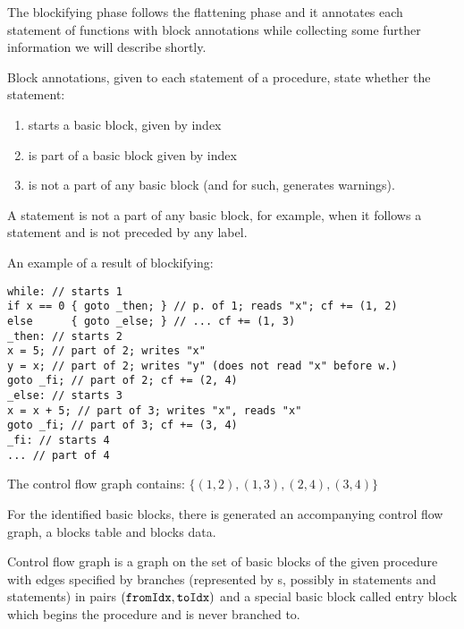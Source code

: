 The blockifying phase follows the flattening phase and it annotates each statement of functions with block annotations while collecting some further information we will describe shortly.

\begin{defn}
    Block annotations, given to each statement of a procedure, state whether the statement:

    \begin{enumerate}
        \item starts a basic block, given by index
        \item is part of a basic block given by index
        \item is not a part of any basic block (and for such, generates warnings).
    \end{enumerate}
\end{defn}

\begin{remark}
    A statement is not a part of any basic block, for example, when it follows a  statement and is not preceded by any label.
\end{remark}

\begin{ex}
    An example of a result of blockifying:
    \begin{lstlisting}
while: // starts 1
if x == 0 { goto _then; } // p. of 1; reads "x"; cf += (1, 2)
else      { goto _else; } // ... cf += (1, 3)
_then: // starts 2
x = 5; // part of 2; writes "x"
y = x; // part of 2; writes "y" (does not read "x" before w.)
goto _fi; // part of 2; cf += (2, 4)
_else: // starts 3
x = x + 5; // part of 3; writes "x", reads "x"
goto _fi; // part of 3; cf += (3, 4)
_fi: // starts 4
... // part of 4
    \end{lstlisting}

    The control flow graph contains: $\{(1,2), (1,3), (2,4), (3,4)\}$
\end{ex}

For the identified basic blocks, there is generated an accompanying control flow graph, a blocks table and blocks data.

\begin{defn}
    Control flow graph is a graph on the set of basic blocks of the given procedure with edges specified by branches (represented by s, possibly in  statements and  statements) in pairs $(\mathtt{fromIdx}, \mathtt{toIdx})$ and a special basic block called entry block which begins the procedure and is never branched to.
\end{defn}

